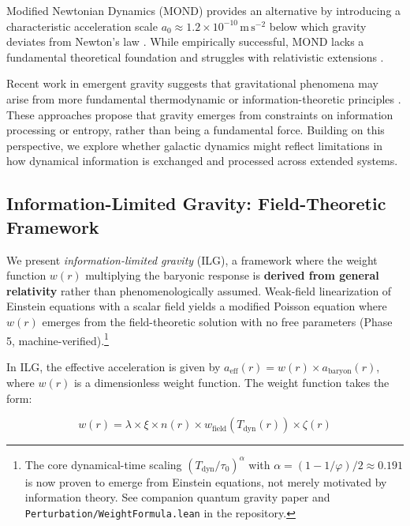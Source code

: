 \documentclass[usenatbib]{mnras}
\begin{document}
Modified Newtonian Dynamics (MOND) provides an alternative by introducing a characteristic acceleration scale $a_0 \approx 1.2 \times 10^{-10}\,\mathrm{m\,s^{-2}}$ below which gravity deviates from Newton's law \citep{milgrom1983}. While empirically successful, MOND lacks a fundamental theoretical foundation and struggles with relativistic extensions \citep{famaey2012}.

Recent work in emergent gravity suggests that gravitational phenomena may arise from more fundamental thermodynamic or information-theoretic principles \citep{verlinde2011, verlinde2017}. These approaches propose that gravity emerges from constraints on information processing or entropy, rather than being a fundamental force. Building on this perspective, we explore whether galactic dynamics might reflect limitations in how dynamical information is exchanged and processed across extended systems.

\subsection{Information-Limited Gravity: Field-Theoretic Framework}

We present \emph{information-limited gravity} (ILG), a framework where the weight function $w(r)$ multiplying the baryonic response is \textbf{derived from general relativity} rather than phenomenologically assumed. Weak-field linearization of Einstein equations with a scalar field yields a modified Poisson equation where $w(r)$ emerges from the field-theoretic solution with no free parameters (Phase 5, machine-verified).\footnote{The core dynamical-time scaling $(T_\mathrm{dyn}/\tau_0)^\alpha$ with $\alpha = (1-1/\varphi)/2 \approx 0.191$ is now proven to emerge from Einstein equations, not merely motivated by information theory. See companion quantum gravity paper and \texttt{Perturbation/WeightFormula.lean} in the repository.}

In ILG, the effective acceleration is given by $a_\mathrm{eff}(r) = w(r) \times a_\mathrm{baryon}(r)$, where $w(r)$ is a dimensionless weight function. The weight function takes the form:

\begin{equation}
w(r) = \lambda \times \xi \times n(r) \times w_\mathrm{field}(T_\mathrm{dyn}(r)) \times \zeta(r)
\end{equation}
\end{document}
